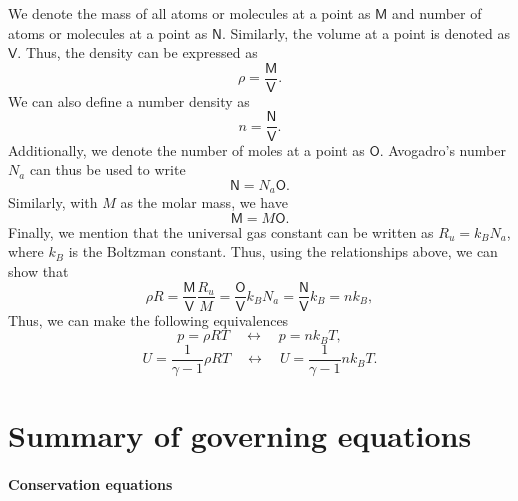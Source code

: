 \documentclass[oneside,a4paper,11pt]{report}
\begin{document}
We denote the mass of all atoms or molecules at a point as $\mathsf{M}$ and number of atoms or molecules at a point as $\mathsf{N}$. Similarly, the volume at a point is denoted as $\mathsf{V}$. Thus, the density can be expressed as
\begin{equation}
    \rho = \frac{\mathsf{M}}{\mathsf{V}}.
\end{equation}
We can also define a number density as
\begin{equation}
    n = \frac{\mathsf{N}}{\mathsf{V}}.
\end{equation}
Additionally, we denote the number of moles at a point as $\mathsf{O}$. Avogadro's number $N_a$ can thus be used to write 
\begin{equation}
    \label{eq:atomistic_particles_moles}
    \mathsf{N} = N_a \mathsf{O}.
\end{equation}
Similarly, with $M$ as the molar mass, we have
\begin{equation}
    \label{eq:atomistic_mass_moles}
    \mathsf{M} = M \mathsf{O}.
\end{equation}
Finally, we mention that the universal gas constant can be written as $R_u = k_B N_a$, where $k_B$ is the Boltzman constant. Thus, using the relationships above, we can show that
\begin{equation}
    \rho R = \frac{\mathsf{M}}{\mathsf{V}} \frac{R_u}{M} = \frac{\mathsf{O}}{\mathsf{V}} k_B N_a = \frac{\mathsf{N}}{\mathsf{V}} k_B = n k_B,
\end{equation}
Thus, we can make the following equivalences
\begin{equation}
    p = \rho R T \quad \longleftrightarrow \quad p = nk_B T,
\end{equation}
\begin{equation}
    U = \frac{1}{\gamma - 1} \rho R T \quad \longleftrightarrow \quad U = \frac{1}{\gamma - 1} n k_B T.
\end{equation}
\section{Summary of governing equations}

\paragraph{Conservation equations}
\end{document}
